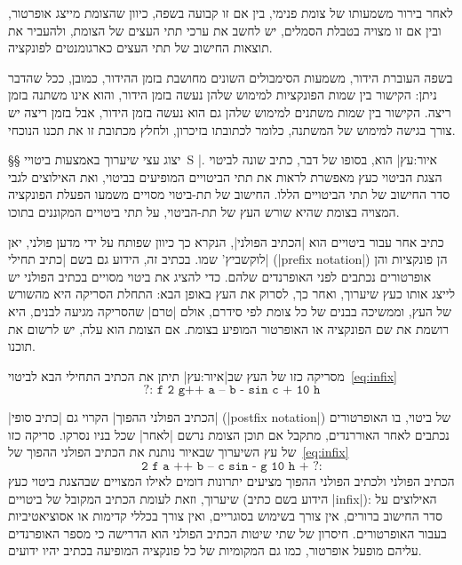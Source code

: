 לאחר בירור משמעותו של צומת פנימי, בין אם זו קבועה בשפה, כיוון שהצומת מייצג
אופרטור, ובין אם זו מצויה בטבלת הסמלים, יש לחשב את ערכי תתי העצים של הצומת,
ולהעביר את תוצאות החישוב של תתי העצים כארגומנטים לפונקציה.

בשפה העוברת הידור, משמעות הסימבולים השונים מחושבת בזמן ההידור, כמובן, ככל שהדבר
ניתן: הקישור בין שמות הפונקציות למימוש שלהן נעשה בזמן הידור, והוא אינו משתנה
בזמן ריצה. הקישור בין שמות משתנים למימוש שלהן גם הוא נעשה בזמן הידור, אבל בזמן
ריצה יש צורך בגישה למימוש של המשתנה, כלומר לכתובתו בזיכרון, ולחלץ מכתובת זו את
תכנו הנוכחי.

§§ יצוג עצי שיערוך באמצעות ביטויי~S
|איור:עץ| הוא, בסופו של דבר, כתיב שונה לביטוי . הצגת הביטוי כעץ מאפשרת לראות את תתי הביטויים המופיעים
בביטוי, ואת האילוצים לגבי סדר החישוב של תתי הביטויים הללו. החישוב של תת-ביטוי
מסויים משמעו הפעלת הפונקציה המצויה בצומת שהיא שורש העץ של תת-הביטוי, על תתי ביטויים
המקוננים בתוכו.

כתיב אחר עבור ביטויים הוא \ע|הכתיב הפולני|, הנקרא כך כיוון שפותח על ידי מדען
פולני, יאן לוקשביץ' שמו. בכתיב זה, הידוע גם בשם \ע|כתיב תחילי| (\E|prefix
notation|) הן פונקציות והן אופרטורים נכתבים לפני האופרנדים שלהם. כדי להציג את
ביטוי מסויים בכתיב הפולני יש לייצג אותו כעץ שיערוך, ואחר כך, לסרוק את העץ באופן
הבא: התחלת הסריקה היא מהשורש של העץ, וממשיכה בבנים של כל צומת לפי סידרם, אולם
\ע|טרם| שהסריקה מגיעה לבנים, היא רושמת את שם הפונקציה או האופרטור המופיע בצומת.
אם הצומת הוא עלה, יש לרשום את תוכנו.

מסריקה כזו של העץ שב|איור:עץ| תיתן את הכתיב התחילי הבא
לביטוי~\ref{eq:infix}
\begin{equation}
  \label{eq:prefix}
  \texttt{?:~f~2 g++~a~--~b~- sin c~+~10 h}
\end{equation}

\ע|הכתיב הפולני ההפוך| הקרוי גם \ע|כתיב סופי| (\E|postfix notation|) של ביטוי, בו
האופרטורים נכתבים לאחר האוררנדים, מתקבל אם תוכן הצומת נרשם \ע|לאחר| שכל בניו
נסרקו. סריקה כזו של עץ השיערוך שבאיור נותנת את הכתיב הפולני ההפוך
של~\ref{eq:infix}
\begin{equation}
  \label{eq:postfix}
  \texttt{2~f~a~++~b~--~c~sin~-~g~10~h~+~?:}
\end{equation}
הכתיב הפולני ולכתיב הפולני ההפוך מציעים יתרונות דומים לאילו המצויים שבהצגת
ביטוי כעץ שיערוך, וזאת לעומת הכתיב המקובל של ביטויים (הידוע בשם כתיב \E|infix|):
האילוצים על סדר החישוב ברורים, אין צורך בשימוש בסוגריים, ואין צורך בכללי קדימות
או אסוציאטיביות בעבור האופרטורים.
חיסרון של שתי שיטות הכתיב הפולני הוא הדרישה כי מספר האופרנדים עליהם מופעל
אופרטור, כמו גם המקומיות של כל פונקציה המופיעה בכתיב יהיו ידועים.

